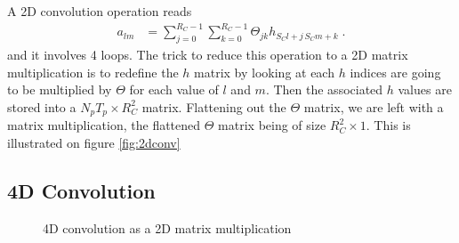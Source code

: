 \begin{subappendices}
A 2D convolution operation reads
\begin{align}
a_{lm}&=\sum_{j=0}^{R_C-1}\sum_{k=0}^{R_C-1}\Theta_{jk}h_{S_Cl+j\,S_Cm+k}\;.
\end{align}
and it involves 4 loops. The trick to reduce this operation to a 2D matrix multiplication is to redefine the $h$ matrix by looking at each $h$ indices are going to be multiplied by $\Theta$ for each value of $l$ and $m$. Then the associated $h$ values are stored into a $N_pT_p\times R_C^2$ matrix. Flattening out the $\Theta$ matrix, we are left with a matrix multiplication, the flattened $\Theta$ matrix being of size $R_C^2\times 1$. This is illustrated on figure \ref{fig:2dconv}

\subsection{4D Convolution}

\begin{figure}[H]
\begin{center}
\caption{\label{fig:4dconv}4D convolution as a 2D matrix multiplication}
\end{center}
\end{figure}




\end{subappendices}
